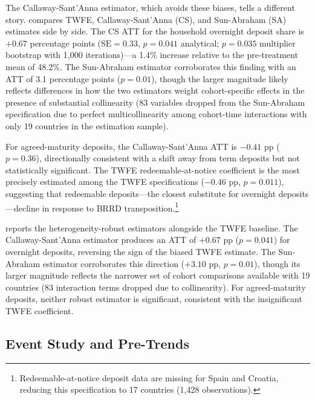 \documentclass[12pt]{article}
\begin{document}
The Callaway-Sant'Anna estimator, which avoids these biases, tells a different story.  compares TWFE, Callaway-Sant'Anna (CS), and Sun-Abraham (SA) estimates side by side. The CS ATT for the household overnight deposit share is $+0.67$ percentage points ($\text{SE} = 0.33$, $p = 0.041$ analytical; $p = 0.035$ multiplier bootstrap with 1{,}000 iterations)---a 1.4\% increase relative to the pre-treatment mean of 48.2\%. The Sun-Abraham estimator corroborates this finding with an ATT of 3.1 percentage points ($p = 0.01$), though the larger magnitude likely reflects differences in how the two estimators weight cohort-specific effects in the presence of substantial collinearity (83 variables dropped from the Sun-Abraham specification due to perfect multicollinearity among cohort-time interactions with only 19 countries in the estimation sample).

For agreed-maturity deposits, the Callaway-Sant'Anna ATT is $-0.41$ pp ($p = 0.36$), directionally consistent with a shift away from term deposits but not statistically significant. The TWFE redeemable-at-notice coefficient is the most precisely estimated among the TWFE specifications ($-0.46$ pp, $p = 0.011$), suggesting that redeemable deposits---the closest substitute for overnight deposits---decline in response to BRRD transposition.\footnote{Redeemable-at-notice deposit data are missing for Spain and Croatia, reducing this specification to 17 countries (1{,}428 observations).}



 reports the heterogeneity-robust estimators alongside the TWFE baseline. The Callaway-Sant'Anna estimator produces an ATT of $+0.67$ pp ($p = 0.041$) for overnight deposits, reversing the sign of the biased TWFE estimate. The Sun-Abraham estimator corroborates this direction ($+3.10$ pp, $p = 0.01$), though its larger magnitude reflects the narrower set of cohort comparisons available with 19 countries (83 interaction terms dropped due to collinearity). For agreed-maturity deposits, neither robust estimator is significant, consistent with the insignificant TWFE coefficient.



\subsection{Event Study and Pre-Trends}
\end{document}
